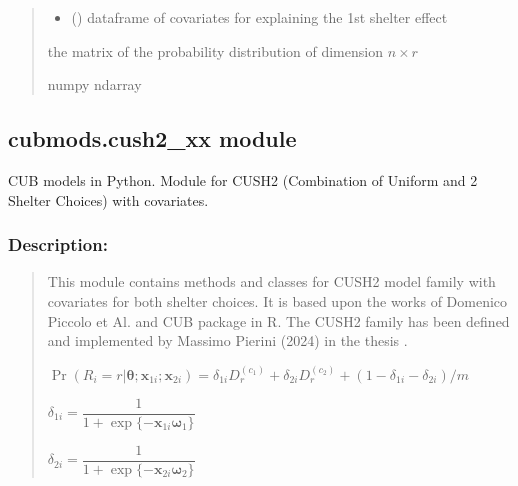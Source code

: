 \documentclass[letterpaper,10pt,english]{sphinxmanual}
\begin{document}
\begin{fulllineitems}
\begin{quote}
\begin{description}
\begin{itemize}
\item {} 
\sphinxAtStartPar
{} () \textendash{} dataframe of covariates for explaining the 1st shelter effect

\end{itemize}

\sphinxAtStartPar
the matrix of the probability distribution of dimension \(n \times r\)

\sphinxAtStartPar
numpy ndarray

\end{description}\end{quote}

\end{fulllineitems}



\subsection{cubmods.cush2\_xx module}
\label{\detokenize{cubmods:module-cubmods.cush2_xx}}\label{\detokenize{cubmods:cubmods-cush2-xx-module}}\label{\detokenize{cubmods:cush2xx-module}}
\sphinxAtStartPar
CUB models in Python.
Module for CUSH2 (Combination of Uniform
and 2 Shelter Choices) with covariates.


\subsubsection{Description:}
\label{\detokenize{cubmods:id548}}\begin{quote}

\sphinxAtStartPar
This module contains methods and classes
for CUSH2 model family with covariates for
both shelter choices.
It is based upon the works of Domenico
Piccolo et Al. and CUB package in R.
The CUSH2 family has been defined and implemented
by Massimo Pierini (2024) in the thesis
.

\sphinxAtStartPar
\(\Pr(R_i=r|\pmb \theta;\pmb x_{1i};\pmb x_{2i}) = \delta_{1i} D_r^{(c_1)} + \delta_{2i} D_r^{(c_2)} + (1 - \delta_{1i} - \delta_{2i})/m\)

\sphinxAtStartPar
\(\delta_{1i} = \dfrac{1}{1+\exp\{ - \pmb x_{1i} \pmb \omega_1 \}}\)

\sphinxAtStartPar
\(\delta_{2i} = \dfrac{1}{1+\exp\{ - \pmb x_{2i} \pmb \omega_2 \}}\)
\end{quote}
\end{document}
